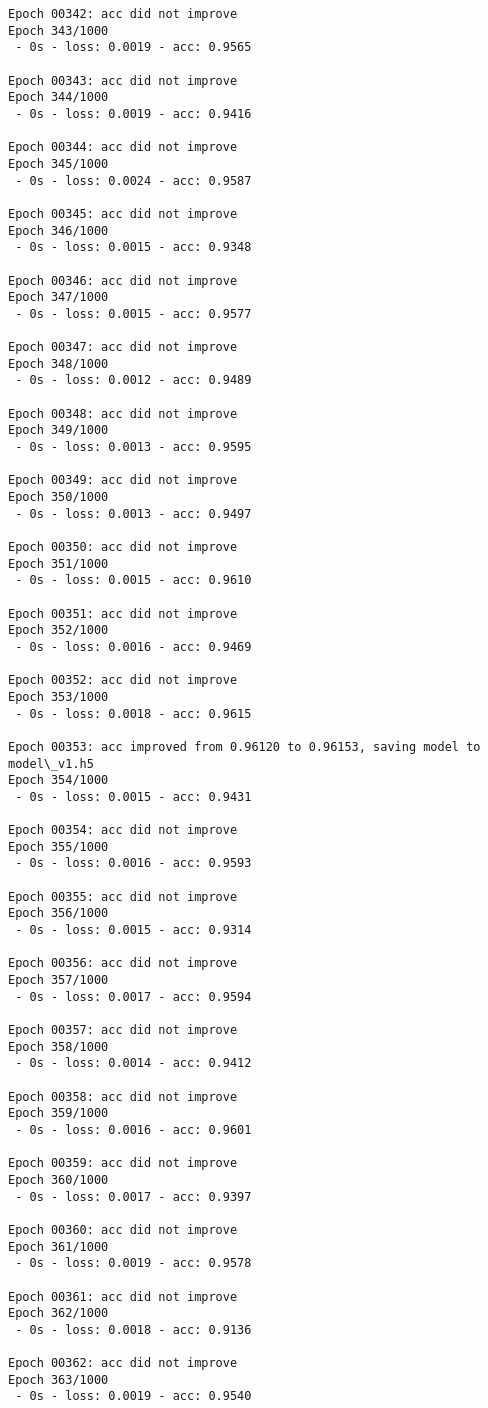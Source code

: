 \documentclass[11pt]{article}
\begin{document}
\begin{Verbatim}[commandchars=\\\{\}]
Epoch 00342: acc did not improve
Epoch 343/1000
 - 0s - loss: 0.0019 - acc: 0.9565

Epoch 00343: acc did not improve
Epoch 344/1000
 - 0s - loss: 0.0019 - acc: 0.9416

Epoch 00344: acc did not improve
Epoch 345/1000
 - 0s - loss: 0.0024 - acc: 0.9587

Epoch 00345: acc did not improve
Epoch 346/1000
 - 0s - loss: 0.0015 - acc: 0.9348

Epoch 00346: acc did not improve
Epoch 347/1000
 - 0s - loss: 0.0015 - acc: 0.9577

Epoch 00347: acc did not improve
Epoch 348/1000
 - 0s - loss: 0.0012 - acc: 0.9489

Epoch 00348: acc did not improve
Epoch 349/1000
 - 0s - loss: 0.0013 - acc: 0.9595

Epoch 00349: acc did not improve
Epoch 350/1000
 - 0s - loss: 0.0013 - acc: 0.9497

Epoch 00350: acc did not improve
Epoch 351/1000
 - 0s - loss: 0.0015 - acc: 0.9610

Epoch 00351: acc did not improve
Epoch 352/1000
 - 0s - loss: 0.0016 - acc: 0.9469

Epoch 00352: acc did not improve
Epoch 353/1000
 - 0s - loss: 0.0018 - acc: 0.9615

Epoch 00353: acc improved from 0.96120 to 0.96153, saving model to model\_v1.h5
Epoch 354/1000
 - 0s - loss: 0.0015 - acc: 0.9431

Epoch 00354: acc did not improve
Epoch 355/1000
 - 0s - loss: 0.0016 - acc: 0.9593

Epoch 00355: acc did not improve
Epoch 356/1000
 - 0s - loss: 0.0015 - acc: 0.9314

Epoch 00356: acc did not improve
Epoch 357/1000
 - 0s - loss: 0.0017 - acc: 0.9594

Epoch 00357: acc did not improve
Epoch 358/1000
 - 0s - loss: 0.0014 - acc: 0.9412

Epoch 00358: acc did not improve
Epoch 359/1000
 - 0s - loss: 0.0016 - acc: 0.9601

Epoch 00359: acc did not improve
Epoch 360/1000
 - 0s - loss: 0.0017 - acc: 0.9397

Epoch 00360: acc did not improve
Epoch 361/1000
 - 0s - loss: 0.0019 - acc: 0.9578

Epoch 00361: acc did not improve
Epoch 362/1000
 - 0s - loss: 0.0018 - acc: 0.9136

Epoch 00362: acc did not improve
Epoch 363/1000
 - 0s - loss: 0.0019 - acc: 0.9540


\end{Verbatim}
\end{document}
